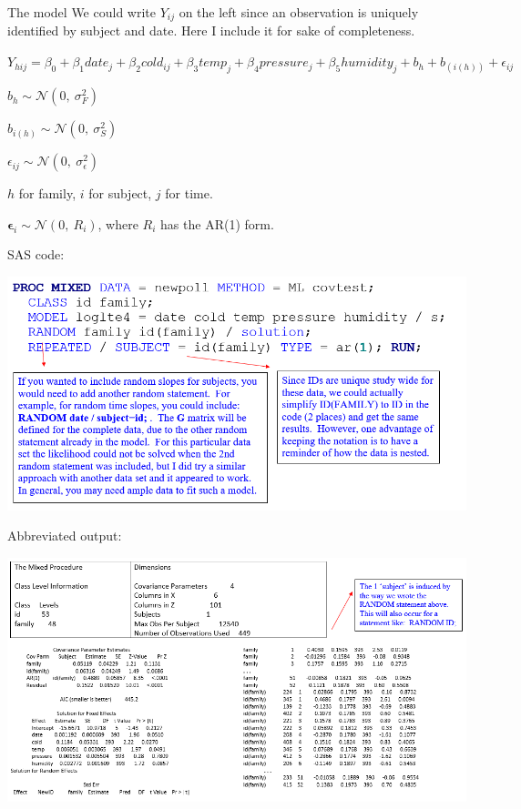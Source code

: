 \documentclass[
  9pt,
  ignorenonframetext,
]{beamer}
\begin{document}
\begin{frame}{The model}
\protect\hypertarget{the-model}{}
We could write \(Y_{ij}\) on the left since an observation is uniquely
identified by subject and date. Here I include it for sake of
completeness.

\(Y_{hij}=\beta_0+\beta_1 date_j+\beta_2 cold_{ij}+\beta_3 temp_j+\beta_4 pressure_j+\beta_5 humidity_j+b_h+b_{(i(h))}+\epsilon_{ij}\)

\(b_h \sim \mathcal N(0,\ \sigma_F^2)\)

\(b_{i(h)} \sim \mathcal N(0,\ \sigma_S^2)\)

\(\epsilon_{ij} \sim \mathcal N(0,\ \sigma_\epsilon^2)\)

\(h\) for family, \(i\) for subject, \(j\) for time.

\(\pmb \epsilon_i \sim \mathcal N(0,\ R_i)\), where \(R_i\) has the
AR(1) form.
\end{frame}

\begin{frame}{SAS code:}
\protect\hypertarget{sas-code}{}
\begin{center}\includegraphics[width=1\linewidth]{figs_L10/f3} \end{center}
\end{frame}

\begin{frame}{Abbreviated output:}
\protect\hypertarget{abbreviated-output}{}
\begin{center}\includegraphics[width=1\linewidth]{figs_L10/f4} \end{center}
\end{frame}
\end{document}
